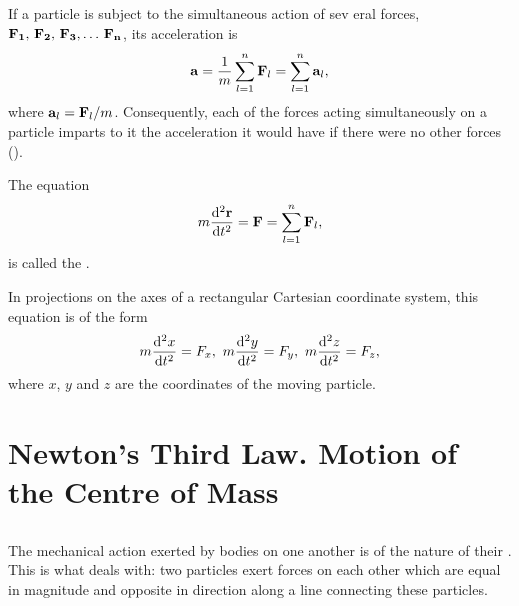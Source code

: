 \subsection{}\label{2.4.4} If a particle is subject to the simultaneous action of sev­ eral forces, $\vb{F_{1}}, \,\vb{F_{2}},\,\vb{F_{3}},\ldots{} \,\vb{F_{n}}$, its acceleration is
\begin{equation*}%
\vb{a} = \frac{1}{m} \sum_{l=1}^{n}\vb{F}_{l} = \sum_{l=1}^{n}\vb{a}_{l},
\end{equation*}
where $\vb{a}_{l} = \vb{F}_{l}/m$. Consequently, each of the forces acting si­multaneously on a particle imparts to it the acceleration it would have if there were no other forces ().

The equation
\begin{equation*}%
m \dv[2]{\vb{r}}{t}  = \vb{F} = \sum_{l=1}^{n} \vb{F}_{l},
\end{equation*}
is called the .

In projections on the axes of a rectangular Cartesian coordinate system, this equation is of the form
\begin{equation*}%
m \dv[2]{x}{t}  = F_{x},\,\,m \dv[2]{y}{t}  = F_{y},\,\,m \dv[2]{z}{t}  = F_{z},
\end{equation*}
where $x$, $y$ and $z$ are the coordinates of the moving particle.



\section{Newton's Third Law. Motion of the Centre of Mass}
\label{sec-2.5}

\subsection{}\label{2.5.1} The mechanical action exerted by bodies on one another is of the nature of their . This is what  deals with: two particles exert forces on each other which are equal in magnitude and opposite in direction along a line connecting these particles.

